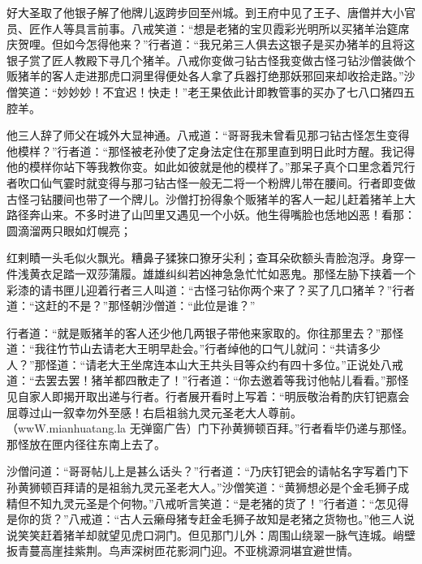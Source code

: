 \documentclass[12pt,UTF8]{ctexbook}
\begin{document}
{	好大圣取了他银子解了他牌儿返跨步回至州城。到王府中见了王子、唐僧并大小官员、匠作人等具言前事。八戒笑道：“想是老猪的宝贝霞彩光明所以买猪羊治筵席庆贺哩。但如今怎得他来？”行者道：“我兄弟三人俱去这银子是买办猪羊的且将这银子赏了匠人教殿下寻几个猪羊。八戒你变做刁钻古怪我变做古怪刁钻沙僧装做个贩猪羊的客人走进那虎口洞里得便处各人拿了兵器打绝那妖邪回来却收拾走路。”沙僧笑道：“妙妙妙！不宜迟！快走！”老王果依此计即教管事的买办了七八口猪四五腔羊。
	
	他三人辞了师父在城外大显神通。八戒道：“哥哥我未曾看见那刁钻古怪怎生变得他模样？”行者道：“那怪被老孙使了定身法定住在那里直到明日此时方醒。我记得他的模样你站下等我教你变。如此如彼就是他的模样了。”那呆子真个口里念着咒行者吹口仙气霎时就变得与那刁钻古怪一般无二将一个粉牌儿带在腰间。行者即变做古怪刁钻腰间也带了一个牌儿。沙僧打扮得象个贩猪羊的客人一起儿赶着猪羊上大路径奔山来。不多时进了山凹里又遇见一个小妖。他生得嘴脸也恁地凶恶！看那：圆滴溜两只眼如灯幌亮；
	
	红剌瞔一头毛似火飘光。糟鼻子猱猍口獠牙尖利；查耳朵砍额头青脸泡浮。身穿一件浅黄衣足踏一双莎蒲履。雄雄纠纠若凶神急急忙忙如恶鬼。那怪左胁下挟着一个彩漆的请书匣儿迎着行者三人叫道：“古怪刁钻你两个来了？买了几口猪羊？”行者道：“这赶的不是？”那怪朝沙僧道：“此位是谁？”
	
	行者道：“就是贩猪羊的客人还少他几两银子带他来家取的。你往那里去？”那怪道：“我往竹节山去请老大王明早赴会。”行者绰他的口气儿就问：“共请多少人？”那怪道：“请老大王坐席连本山大王共头目等众约有四十多位。”正说处八戒道：“去罢去罢！猪羊都四散走了！”行者道：“你去邀着等我讨他帖儿看看。”那怪见自家人即揭开取出递与行者。行者展开看时上写着：“明辰敬治肴酌庆钉钯嘉会屈尊过山一叙幸勿外至感！右启祖翁九灵元圣老大人尊前。（wwW.mianhuatang.la 无弹窗广告）门下孙黄狮顿百拜。”行者看毕仍递与那怪。那怪放在匣内径往东南上去了。
	
	沙僧问道：“哥哥帖儿上是甚么话头？”行者道：“乃庆钉钯会的请帖名字写着门下孙黄狮顿百拜请的是祖翁九灵元圣老大人。”沙僧笑道：“黄狮想必是个金毛狮子成精但不知九灵元圣是个何物。”八戒听言笑道：“是老猪的货了！”行者道：“怎见得是你的货？”八戒道：“古人云癞母猪专赶金毛狮子故知是老猪之货物也。”他三人说说笑笑赶着猪羊却就望见虎口洞门。但见那门儿外：周围山绕翠一脉气连城。峭壁扳青蔓高崖挂紫荆。鸟声深树匝花影洞门迎。不亚桃源洞堪宜避世情。
	
}
\end{document}
